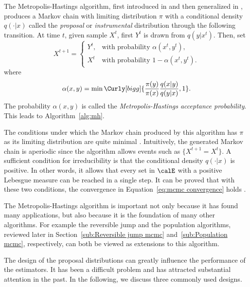 The Metropolis-Hastings algorithm, first introduced in
\cite{Metropolis:1953ex} and then generalized in \cite{Hastings:1970gd},
produces a Markov chain with limiting distribution $\pi$ with a conditional
density $q(\cdot|x)$ called the \emph{proposal} or \emph{instrumental}
distribution through the following transition. At time $t$, given sample
$X^t$, first $Y^t$ is drawn from $q(y|x^t)$. Then, set
\begin{equation*}
  X^{t+1} =
  \begin{cases}
    Y^t, &\text{with probability } \alpha(x^t,y^t),\\
    X^t  &\text{with probability } 1 - \alpha(x^t,y^t).
  \end{cases}
\end{equation*}
where
\begin{equation}
  \alpha(x,y) =
  \min\Curly[bigg]{\frac{\pi(y)}{\pi(x)}\frac{q(x|y)}{q(y|x)},1}.
\end{equation}
The probability $\alpha(x,y)$ is called the \emph{Metropolis-Hastings
  acceptance probability}. This leads to Algorithm~\ref{alg:mh}.



The conditions under which the Markov chain produced by this algorithm has
$\pi$ as its limiting distribution are quite minimal
\cite[][sec.~7.3.2]{Robert:2004tn}. Intuitively, the generated Markov chain is
aperiodic since the algorithm allows events such as $\{X^{t+1} = X^t\}$. A
sufficient condition for irreducibility is that the conditional density
$q(\cdot|x)$ is positive. In other words, it allows that every set in $\calE$
with a positive Lebesgue measure can be reached in a single step. It can be
proved that with these two conditions, the convergence in
Equation~\eqref{eq:mcmc convergence} holds \cite[][Theorem~7.4 and
Corollary~7.5]{Robert:2004tn}.

The Metropolis-Hastings algorithm is important not only because it has found
many applications, but also because it is the foundation of many other
algorithms. For example the reversible jump \mcmc and the population \mcmc
algorithms, reviewed later in Section~\ref{sub:Reversible jump mcmc}
and~\ref{sub:Population mcmc}, respectively, can both be viewed as extensions
to this algorithm.

The design of the proposal distributions can greatly influence the performance
of the estimators. It has been a difficult problem and has attracted
substantial attention in the past. In the following, we discuss three commonly
used designs.

